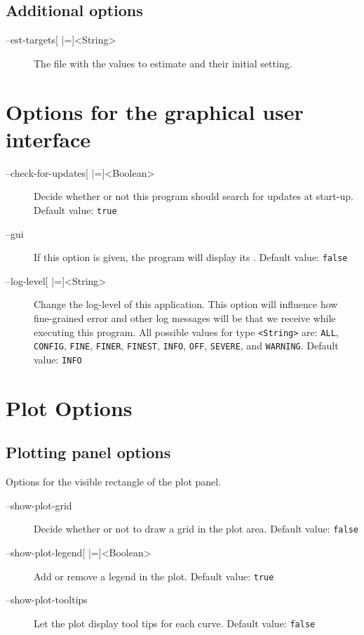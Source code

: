 \subsection{Additional options}
\begin{description}
\item[--est-targets{[} |={]}<String>]
          The file with the values to estimate and their initial setting.
\end{description}

\section{Options for the graphical user interface}
\begin{description}
\item[--check-for-updates{[} |={]}<Boolean>]
          Decide whether or not this program should search for updates
          at start-up.
          Default value: \texttt{true}
\item[--gui]
          If this option is given, the program will display its \GUI.
          Default value: \texttt{false}
\item[--log-level{[} |={]}<String>]
          Change the log-level of this application. This option will influence
          how fine-grained error and other log messages will be that we
          receive while executing this program.
          All possible values for type \texttt{<String>} are:
          \texttt{ALL}, \texttt{CONFIG},
          \texttt{FINE}, \texttt{FINER},
          \texttt{FINEST}, \texttt{INFO},
          \texttt{OFF}, \texttt{SEVERE}, and \texttt{WARNING}.
          Default value: \texttt{INFO}
\end{description}

\section{Plot Options}
\subsection{Plotting panel options}
Options for the visible rectangle of the plot panel.
\begin{description}
\item[--show-plot-grid]
          Decide whether or not to draw a grid in the plot area.
          Default value: \texttt{false}
\item[--show-plot-legend{[} |={]}<Boolean>]
          Add or remove a legend in the plot.
          Default value: \texttt{true}
\item[--show-plot-tooltips]
          Let the plot display tool tips for each curve.
          Default value: \texttt{false}
\end{description}

